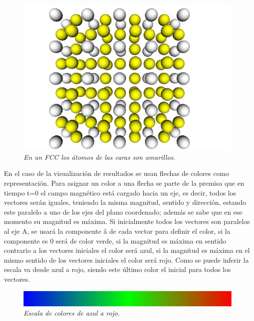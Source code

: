 \begin{figure}[H]
  \centering
  \includegraphics[scale=.35]{images/atomCanvas-FCC}
  \caption{\em En un FCC los átomos de las caras son amarillos.}
\end{figure}

En el caso de la visualización de resultados se usan flechas de colores como representación. Para asignar un color a una flecha se parte de la premisa que en tiempo t=0 el campo magnético está cargado hacia un eje, es decir, todos los vectores serán iguales, teniendo la misma magnitud, sentido y dirección, estando este paralelo a uno de los ejes del plano coordenado; además se sabe que en ese momento su magnitud es máxima. Si inicialmente todos los vectores son paralelos al eje A, se usará la componente â de cada vector para definir el color, si la componente es 0 será de color verde, si la magnitud es máxima en sentido contrario a los vectores iniciales el color será azul, si la magnitud es máxima en el mismo sentido de los vectores iniciales el color será rojo. Como se puede inferir la escala va desde azul a rojo, siendo este último color el inicial para todos los vectores.

\begin{figure}[H]
  \centering
  \includegraphics[scale=.5]{images/atomCanvas-colorScale}
  \caption{\em Escala de colores de azul a rojo.}
\end{figure}

